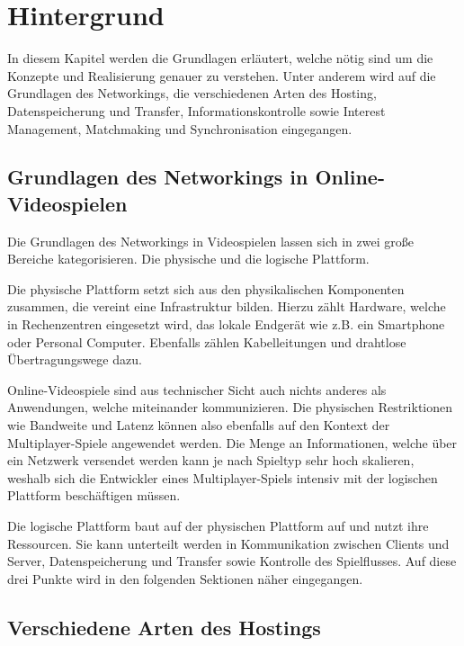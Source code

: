 
\chapter{Hintergrund}
\label{sec:hintergrund}

In diesem Kapitel werden die Grundlagen erläutert, welche nötig sind um die Konzepte und Realisierung genauer zu verstehen. Unter anderem wird auf die Grundlagen des Networkings, die verschiedenen Arten des Hosting, Datenspeicherung und Transfer, Informationskontrolle sowie Interest Management, Matchmaking und Synchronisation eingegangen.

\section{Grundlagen des Networkings in Online-Videospielen}

Die Grundlagen des Networkings in Videospielen lassen sich in zwei große Bereiche kategorisieren. Die physische und die logische Plattform. 

Die physische Plattform setzt sich aus den physikalischen Komponenten zusammen, die vereint eine Infrastruktur bilden. Hierzu zählt Hardware, welche in Rechenzentren eingesetzt wird, das lokale Endgerät wie z.B. ein Smartphone oder Personal Computer. Ebenfalls zählen Kabelleitungen und drahtlose Übertragungswege dazu. 

Online-Videospiele sind aus technischer Sicht auch nichts anderes als Anwendungen, welche miteinander kommunizieren. Die physischen Restriktionen wie Bandweite und Latenz können also ebenfalls auf den Kontext der Multiplayer-Spiele angewendet werden. Die Menge an Informationen, welche über ein Netzwerk versendet werden kann je nach Spieltyp sehr hoch skalieren, weshalb sich die Entwickler eines Multiplayer-Spiels intensiv mit der logischen Plattform beschäftigen müssen.

Die logische Plattform baut auf der physischen Plattform auf und nutzt ihre Ressourcen. Sie kann unterteilt werden in Kommunikation zwischen Clients und Server, Datenspeicherung und Transfer sowie Kontrolle des Spielflusses. Auf diese drei Punkte wird in den folgenden Sektionen näher eingegangen.

\cite{Smed.2002c}


\section{Verschiedene Arten des Hostings}
\label{arten_des_hostings}

